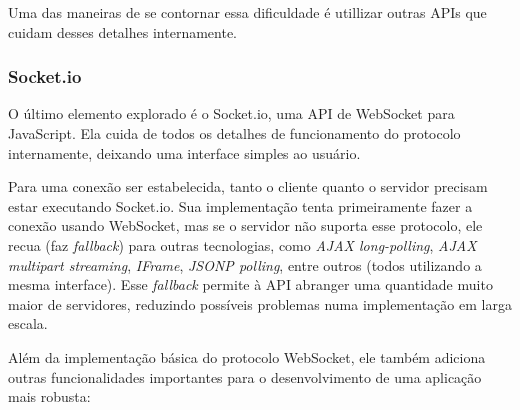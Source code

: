 \documentclass[a4paper,12pt]{article}
\begin{document}
Uma das maneiras de se contornar essa dificuldade é utillizar outras APIs que cuidam desses detalhes internamente.


\subsubsection{Socket.io}

O último elemento explorado é o Socket.io, uma API de WebSocket para JavaScript. Ela cuida de todos os detalhes de funcionamento do protocolo internamente, deixando uma interface simples ao usuário.

Para uma conexão ser estabelecida, tanto o cliente quanto o servidor precisam estar executando Socket.io. Sua implementação tenta primeiramente fazer a conexão usando WebSocket, mas se o servidor não suporta esse protocolo, ele recua (faz \emph{fallback}) para outras tecnologias, como \emph{AJAX long-polling}, \emph{AJAX multipart streaming}, \emph{IFrame}, \emph{JSONP polling}, entre outros (todos utilizando a mesma interface). Esse \emph{fallback} permite à API abranger uma quantidade muito maior de servidores, reduzindo possíveis problemas numa implementação em larga escala.

Além da implementação básica do protocolo WebSocket, ele também adiciona outras funcionalidades importantes para o desenvolvimento de uma aplicação mais robusta:
\end{document}
